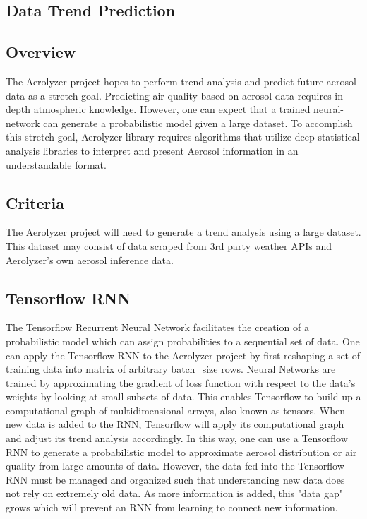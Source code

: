 \documentclass[onecolumn, draftclsnofoot,10pt, compsoc]{IEEEtran}
\begin{document}
\begin{singlespace}
\section{Data Trend Prediction}
	\subsection{Overview}
		The Aerolyzer project hopes to perform trend analysis and predict future aerosol data as a stretch-goal.
		Predicting air quality based on aerosol data requires in-depth atmospheric knowledge.
		However, one can expect that a trained neural-network can generate a probabilistic model given a large dataset.
		To accomplish this stretch-goal, Aerolyzer library requires algorithms that utilize deep statistical analysis libraries to interpret and present Aerosol information in an understandable format.

	\subsection{Criteria}
		The Aerolyzer project will need to generate a trend analysis using a large dataset.
		This dataset may consist of data scraped from 3rd party weather APIs and Aerolyzer’s own aerosol inference data.			

	\subsection{Tensorflow RNN}
		The Tensorflow Recurrent Neural Network facilitates the creation of a probabilistic model which can assign probabilities to a sequential set of data.
		One can apply the Tensorflow RNN to the Aerolyzer project by first reshaping a set of training data into matrix of arbitrary batch\_size rows.
		Neural Networks are trained by approximating the gradient of loss function with respect to the data’s weights by looking at small subsets of data.
		This enables Tensorflow to build up a computational graph of multidimensional arrays, also known as tensors.
		When new data is added to the RNN, Tensorflow will apply its computational graph and adjust its trend analysis accordingly.
		In this way, one can use a Tensorflow RNN to generate a probabilistic model to approximate aerosol distribution or air quality from large amounts of data.
		However, the data fed into the Tensorflow RNN must be managed and organized such that understanding new data does not rely on extremely old data.
		As more information is added, this "data gap" grows which will prevent an RNN from learning to connect new information. \cite{RNN}


\end{singlespace}
\end{document}
